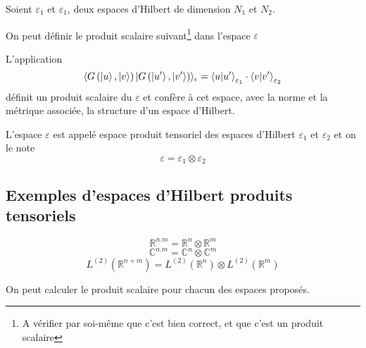 Soient $\varepsilon_1$ et $\varepsilon_1$, deux espaces d'Hilbert de dimension $N_1$ et $N_2$.

On peut définir le produit scalaire suivant\footnote{A vérifier par soi-même que c'est bien correct, et que c'est un produit scalaire} dans l'espace $\varepsilon$ 
\begin{thm}
	L'application
	$$ \langle G \left(\ket{u},\ket{v}\right)|  G \left(\ket{u'},\ket{v'}\right) \rangle_\epsilon = \braket{u|u'}_{\varepsilon_1} \cdot \braket{v|v'}_{\varepsilon_2}$$
	définit un produit scalaire du $\varepsilon$ et confère à cet espace, avec la norme et la métrique associée, la structure d'un espace d'Hilbert.
\end{thm}

\begin{definition}
	L'espace $\varepsilon$ est appelé espace produit tensoriel des espaces d'Hilbert $\varepsilon_1$ et $\varepsilon_2$ et on le note
	$$ \varepsilon = \varepsilon_1 \otimes \varepsilon_2$$
\end{definition}

\subsection{Exemples d'espaces d'Hilbert produits tensoriels}

$$ \mathbb{R}^{n. m} = \mathbb{R}^n \otimes \mathbb{R}^m $$
$$ \mathbb{C}^{n. m} = \mathbb{C}^n \otimes \mathbb{C}^m $$
$$ L^{(2)}( \mathbb{R}^{n+m}) = L^{(2)}( \mathbb{R}^{n}) \otimes L^{(2)}( \mathbb{R}^{m})$$

On peut calculer le produit scalaire pour chacun des espaces proposés.

